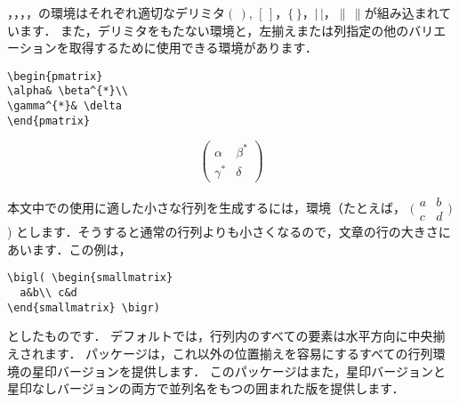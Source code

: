 ，，，，の環境はそれぞれ適切なデリミタ$(\,)$, $[\,]$，$\lbrace\, \rbrace$，$\lvert\,\rvert $，$\lVert\,\rVert $が組み込まれています．
また，デリミタをもたない環境と，左揃えまたは列指定の他のバリエーションを取得するために使用できる環境があります．
\begin{center}
\begin{minipage}{.4\columnwidth}
\begin{verbatim}
\begin{pmatrix}
\alpha& \beta^{*}\\
\gamma^{*}& \delta
\end{pmatrix}
\end{verbatim}
\end{minipage}
\qquad
\begin{minipage}{.4\columnwidth}
\[
\begin{pmatrix}
\alpha& \beta^{*}\\
\gamma^{*}& \delta
\end{pmatrix}
\]
\end{minipage}
\end{center}
本文中での使用に適した小さな行列を生成するには，環境（たとえば，
\begin{math}
\bigl( \begin{smallmatrix}
  a&b\\ c&d
\end{smallmatrix} \bigr)
\end{math})
とします．そうすると通常の行列よりも小さくなるので，文章の行の大きさにあいます．この例は，
\begin{verbatim}
\bigl( \begin{smallmatrix}
  a&b\\ c&d
\end{smallmatrix} \bigr)
\end{verbatim}
としたものです．
デフォルトでは，行列内のすべての要素は水平方向に中央揃えされます．
パッケージは，これ以外の位置揃えを容易にするすべての行列環境の星印バージョンを提供します．
このパッケージはまた，星印バージョンと星印なしバージョンの両方で並列名をもつの囲まれた版を提供します．

